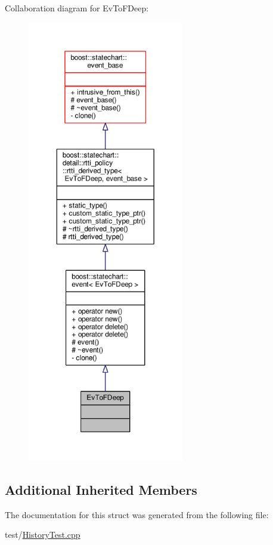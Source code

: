 Collaboration diagram for Ev\+To\+F\+Deep\+:
\nopagebreak
\begin{figure}[H]
\begin{center}
\leavevmode
\includegraphics[height=550pt]{struct_ev_to_f_deep__coll__graph}
\end{center}
\end{figure}
\subsection*{Additional Inherited Members}


The documentation for this struct was generated from the following file\+:\begin{DoxyCompactItemize}
\item 
test/\mbox{\hyperlink{_history_test_8cpp}{History\+Test.\+cpp}}\end{DoxyCompactItemize}
